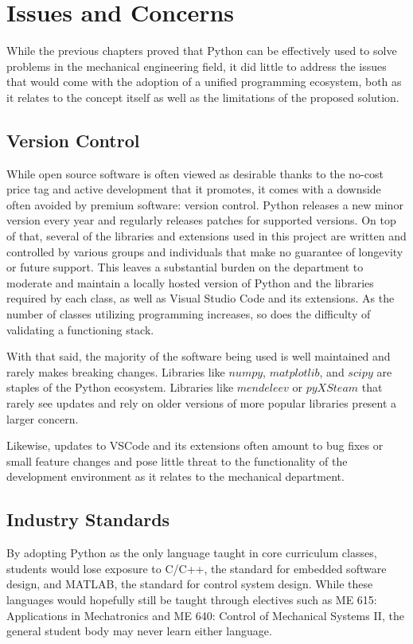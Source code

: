 \section{Issues and Concerns}

While the previous chapters proved that Python can be effectively
used to solve problems in the mechanical engineering field, it did 
little to address the issues that would come with the adoption 
of a unified programming ecosystem, both as it relates to the
concept itself as well as the limitations of the proposed solution.

\subsection{Version Control}

While open source software is often viewed as desirable
thanks to the no-cost price tag and active development that it 
promotes, it comes with a downside often avoided by premium
software: version control. Python releases a new minor version
every year and regularly releases patches for supported versions.
On top of that, several of the libraries and extensions 
used in this project are written and controlled by various 
groups and individuals that make no guarantee of longevity or future
support. This leaves a substantial burden on the department to
moderate and maintain a locally hosted version of Python and the
libraries required by each class, as well as Visual Studio Code and
its extensions. As the number of classes utilizing programming
increases, so does the difficulty of validating a functioning stack.

With that said, the majority of the software being used is well
maintained and rarely makes breaking changes. Libraries like $numpy$,
$matplotlib$, and $scipy$ are staples of the Python ecosystem. Libraries
like $mendeleev$ or $pyXSteam$ that rarely see updates and rely on older
versions of more popular libraries present a larger concern.

Likewise, updates to VSCode and its extensions often
amount to bug fixes or small feature changes and pose little threat
to the functionality of the development environment as it relates to
the mechanical department.

\subsection{Industry Standards}

By adopting Python as the only language taught in core curriculum
classes, students would lose exposure to C/C++, the standard for 
embedded software design, and MATLAB, the standard for control system
design. While these languages would hopefully still be taught
through electives such as ME 615: Applications in Mechatronics 
and ME 640: Control of Mechanical Systems II, the general student body
may never learn either language. 

